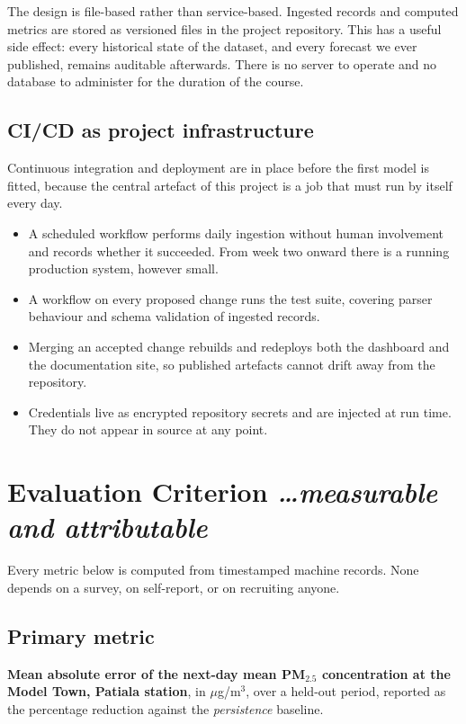\documentclass[11pt,a4paper]{article}
\newcommand{\BvrHint}[1]{%
  {\normalfont\normalsize\itshape\hfill #1}}
\begin{document}
The design is file-based rather than service-based.
Ingested records and computed metrics are stored as
versioned files in the project repository. This has a
useful side effect: every historical state of the
dataset, and every forecast we ever published, remains
auditable afterwards. There is no server to operate and
no database to administer for the duration of the
course.

\subsection{CI/CD as project infrastructure}
Continuous integration and deployment are in place
before the first model is fitted, because the central
artefact of this project is a job that must run by
itself every day.

\begin{itemize}[leftmargin=0.7cm]
  \item A scheduled workflow performs daily ingestion
    without human involvement and records whether it
    succeeded. From week two onward there is a running
    production system, however small.
  \item A workflow on every proposed change runs the
    test suite, covering parser behaviour and schema
    validation of ingested records.
  \item Merging an accepted change rebuilds and
    redeploys both the dashboard and the documentation
    site, so published artefacts cannot drift away from
    the repository.
  \item Credentials live as encrypted repository secrets
    and are injected at run time. They do not appear in
    source at any point.
\end{itemize}

\section{Evaluation Criterion %
\BvrHint{\ldots measurable and attributable}}
Every metric below is computed from timestamped machine
records. None depends on a survey, on self-report, or on
recruiting anyone.

\subsection{Primary metric}
\textbf{Mean absolute error of the next-day mean PM$_{2.5}$
concentration at the Model Town, Patiala station}, in
$\mu$g/m$^3$, over a held-out period, reported as the percentage
reduction against the \emph{persistence} baseline.
\end{document}
